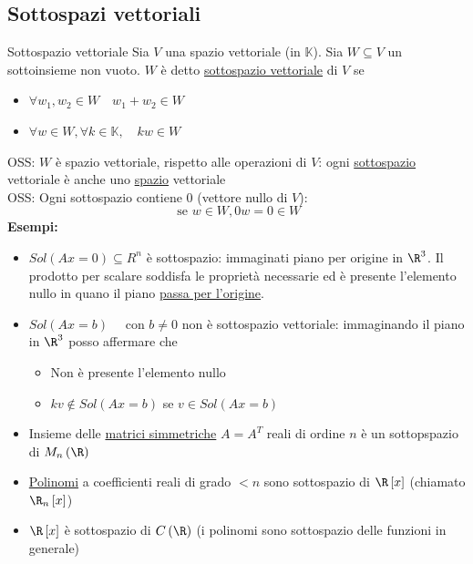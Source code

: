 \subsection{Sottospazi vettoriali}
\begin{definizione}{Sottospazio vettoriale}
	Sia $V$ una spazio vettoriale (in $\mathbb{K}$). Sia $W \subseteq V$ un sottoinsieme non vuoto. $W$ è detto \underline{sottospazio vettoriale} di $V$ se
	\begin{itemize}
		\item $\forall w_1, w_2 \in W \quad w_1+w_2 \in  W$
		\item $\forall w \in  W, \forall k \in  \mathbb{K}, \quad kw \in  W$
	\end{itemize}
\end{definizione}
OSS: $W$ è spazio vettoriale, rispetto alle operazioni di $V$: ogni \underline{sottospazio} vettoriale è anche uno \underline{spazio} vettoriale\\
OSS: Ogni sottospazio contiene $0$ (vettore nullo di $V$):
\[
	\text{ se } w \in  W , 0w=0 \in W
\]
\textbf{Esempi:}
\begin{itemize}
	\item $Sol\left( Ax= 0\right) \subseteq R^{n}$ è sottospazio: immaginati piano per origine in  $\R^{3}$. Il prodotto per scalare soddisfa le proprietà necessarie ed è presente l'elemento nullo in quano il piano \underline{passa per l'origine}.
	\item $Sol\left( Ax=b \right) \quad \text{ con } b \neq 0$ non è sottospazio vettoriale: immaginando il piano in $\R^{3}$ posso affermare che
	      \begin{itemize}
		      \item Non è presente l'elemento nullo
		      \item $kv \not\in Sol\left( Ax=b \right) $ se $v \in Sol\left( Ax=b \right) $
	      \end{itemize}
	\item Insieme delle \underline{matrici simmetriche} $A=A^{T}$ reali di ordine $n$ è un sottopspazio di $M_n\left( \R \right) $
	\item  \underline{Polinomi} a coefficienti reali di grado $ < n$ sono sottospazio di $\R \left[ x \right] $ (chiamato $ \R_n\left[ x \right] $)
	\item $\R\left[ x \right] $ è sottospazio di $C\left( \R \right) $ (i polinomi sono sottospazio delle funzioni in generale)
\end{itemize}
